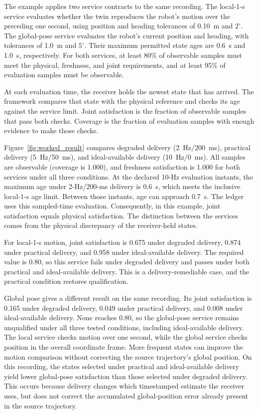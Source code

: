 \documentclass[journal]{IEEEtran}
\begin{document}
The example applies two service contracts to the same recording.
The local-1-s service evaluates whether the twin reproduces the
robot's motion over the preceding one second, using position and
heading tolerances of 0.10~m and $2^\circ$. The global-pose service
evaluates the robot's current position and heading, with tolerances
of 1.0~m and $5^\circ$. Their maximum permitted state ages are
0.6~s and 1.0~s, respectively. For both services, at least 80\% of
observable samples must meet the physical, freshness, and joint
requirements, and at least 95\% of evaluation samples must be
observable.

At each evaluation time, the receiver holds the newest state that has
arrived. The framework compares that state with the physical reference
and checks its age against the service limit. Joint satisfaction is the
fraction of observable samples that pass both checks. Coverage is the
fraction of evaluation samples with enough evidence to make those checks.

Figure~\ref{fig:worked_result} compares degraded delivery
(2~Hz/200~ms), practical delivery (5~Hz/50~ms), and
ideal-available delivery (10~Hz/0~ms). All samples are observable
(coverage is 1.000), and freshness satisfaction is 1.000 for both
services under all three conditions. At the declared 10-Hz evaluation
instants, the maximum age under 2-Hz/200-ms delivery is 0.6~s,
which meets the inclusive local-1-s age limit. Between those instants,
age can approach 0.7~s. The ledger uses this sampled-time evaluation.
Consequently, in this example,
joint satisfaction equals physical satisfaction. The distinction
between the services comes from the physical discrepancy of the
receiver-held states.

For local-1-s motion, joint satisfaction is 0.675 under degraded
delivery, 0.874 under practical delivery, and 0.958 under
ideal-available delivery. The required value is 0.80, so this service
fails under degraded delivery and passes under both practical and
ideal-available delivery. This is a delivery-remediable case, and
the practical condition restores qualification.

Global pose gives a different result on the same recording. Its joint
satisfaction is 0.165 under degraded delivery, 0.049 under practical
delivery, and 0.008 under ideal-available delivery. None reaches
0.80, so the global-pose service remains unqualified under all three
tested conditions, including ideal-available delivery. The local
service checks motion over one second, while the global service checks
position in the overall coordinate frame. More frequent states can
improve the motion comparison without correcting the source
trajectory's global position. On this recording, the states selected
under practical and ideal-available delivery yield lower global-pose
satisfaction than those selected under degraded delivery. This occurs because delivery changes which timestamped estimate the receiver uses, but does not correct the accumulated global-position error already present in the source trajectory.
\end{document}
